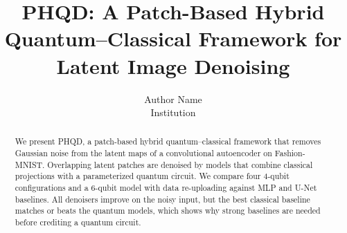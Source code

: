 \documentclass[10pt,twocolumn]{article}
\title{PHQD: A Patch-Based Hybrid Quantum--Classical Framework for Latent Image Denoising}
\author{Author Name\\ Institution}
\date{}
\begin{document}
\maketitle

\begin{abstract}
We present PHQD, a patch-based hybrid quantum--classical framework that removes Gaussian noise from the latent maps of a convolutional autoencoder on Fashion-MNIST. Overlapping latent patches are denoised by models that combine classical projections with a parameterized quantum circuit. We compare four 4-qubit configurations and a 6-qubit model with data re-uploading against MLP and U-Net baselines. All denoisers improve on the noisy input, but the best classical baseline matches or beats the quantum models, which shows why strong baselines are needed before crediting a quantum circuit.
\end{abstract}











\end{document}
